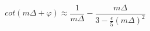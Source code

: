 \begin{equation}
cot(m \Delta+ \varphi) \approx \frac{1}{m \Delta}- \frac{m \Delta}{3-\frac{ \epsilon}{5} (m \Delta)^2}
 \end{equation}

